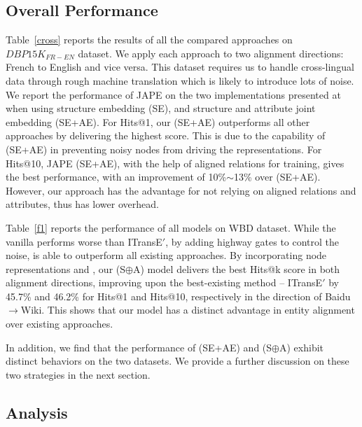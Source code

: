 \subsection{Overall Performance\label{overall}}


 Table~\ref{cross} reports the results of all the compared approaches on $DBP15K_{FR-EN}$
dataset. We apply each approach
 to two alignment directions: French to English and vice versa. This dataset requires us to handle
cross-lingual data through rough machine translation which is likely to introduce lots of noise. We report the performance of JAPE on the
two implementations presented at
 ~\cite{sun2017cross} when using structure embedding (SE), and structure and attribute joint embedding (SE+AE).
For Hits@1, our \HRGCN (SE+AE)
outperforms all other approaches by delivering the highest score. This is due to the capability of \HRGCN
(SE+AE) in preventing noisy nodes from driving the \KG representations. For Hits@10, JAPE (SE+AE), with the help of aligned relations for training,
 gives the best performance, with an improvement of 10\%$\sim$13\% over \HRGCN (SE+AE). However, our approach has the advantage for not relying on aligned
relations and attributes, thus has lower overhead.


 Table~\ref{f1} reports the performance of all models on WBD dataset. While the vanilla \GCN performs worse than
ITransE$'$, %
  by adding highway gates to control the noise, \HGCN is able to outperform all existing approaches. By
incorporating node representations and \RGCN, our \HRGCN (S$\oplus$A) model delivers the best Hits@k score in both alignment directions,
improving upon the best-existing method -- ITransE$'$ by 45.7\% and 46.2\% for Hits@1 and Hits@10, respectively in the direction of
Baidu$\rightarrow$Wiki. This shows that our model has a distinct advantage in entity alignment over existing approaches.

In addition, we find that the performance of \HRGCN (SE+AE) and \HRGCN (S$\oplus$A) exhibit distinct behaviors on the two datasets. We
provide a further discussion on these two strategies in the next section.


\subsection{Analysis\label{sec:analysis}}



